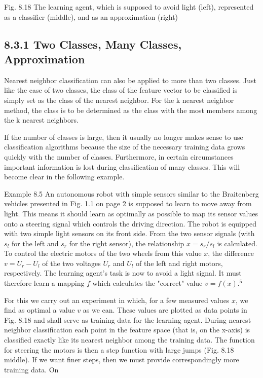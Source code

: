 \documentclass[10pt]{article}
\begin{document}
Fig. 8.18 The learning agent, which is supposed to avoid light (left), represented as a classifier (middle), and as an approximation (right)

\subsection*{8.3.1 Two Classes, Many Classes, Approximation}
Nearest neighbor classification can also be applied to more than two classes. Just like the case of two classes, the class of the feature vector to be classified is simply set as the class of the nearest neighbor. For the k nearest neighbor method, the class is to be determined as the class with the most members among the k nearest neighbors.

If the number of classes is large, then it usually no longer makes sense to use classification algorithms because the size of the necessary training data grows quickly with the number of classes. Furthermore, in certain circumstances important information is lost during classification of many classes. This will become clear in the following example.

Example 8.5 An autonomous robot with simple sensors similar to the Braitenberg vehicles presented in Fig. 1.1 on page 2 is supposed to learn to move away from light. This means it should learn as optimally as possible to map its sensor values onto a steering signal which controls the driving direction. The robot is equipped with two simple light sensors on its front side. From the two sensor signals (with $s_{l}$ for the left and $s_{r}$ for the right sensor), the relationship $x=s_{r} / s_{l}$ is calculated. To control the electric motors of the two wheels from this value $x$, the difference $v=U_{r}-U_{l}$ of the two voltages $U_{r}$ and $U_{l}$ of the left and right motors, respectively. The learning agent's task is now to avoid a light signal. It must therefore learn a mapping $f$ which calculates the "correct" value $v=f(x) .^{5}$

For this we carry out an experiment in which, for a few measured values $x$, we find as optimal a value $v$ as we can. These values are plotted as data points in Fig. 8.18 and shall serve as training data for the learning agent. During nearest neighbor classification each point in the feature space (that is, on the x-axis) is classified exactly like its nearest neighbor among the training data. The function for steering the motors is then a step function with large jumps (Fig. 8.18 middle). If we want finer steps, then we must provide correspondingly more training data. On
\end{document}
